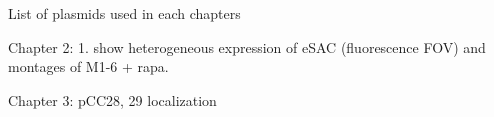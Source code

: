 List of plasmids used in each chapters

Chapter 2: 1. show heterogeneous expression of eSAC (fluorescence FOV) and montages of M1-6 + rapa.

Chapter 3: pCC28, 29 localization